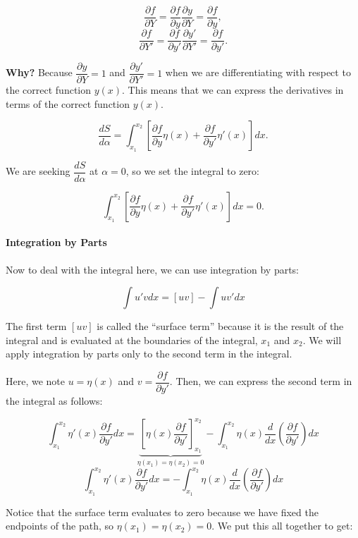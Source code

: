 \documentclass[11pt]{article}
\begin{document}
\[\dfrac{\partial f}{\partial Y} = \dfrac{\partial f}{\partial y}\dfrac{\partial y}{\partial Y} = \dfrac{\partial f}{\partial y},\]
\[\dfrac{\partial f}{\partial Y'} = \dfrac{\partial f}{\partial y'}\dfrac{\partial y'}{\partial Y'} = \dfrac{\partial f}{\partial y'}.\]

\textbf{Why?} Because \(\dfrac{\partial y}{\partial Y} = 1\) and
\(\dfrac{\partial y'}{\partial Y'} = 1\) when we are differentiating
with respect to the correct function \(y(x)\). This means that we can
express the derivatives in terms of the correct function \(y(x)\).

\[\dfrac{dS}{d\alpha} = \int_{x_1}^{x_2}\left[ \dfrac{\partial f}{\partial y}\eta(x) + \dfrac{\partial f}{\partial y'}\eta'(x) \right] dx.\]

We are seeking \(\dfrac{dS}{d\alpha}\) at \(\alpha = 0\), so we set the
integral to zero:

\[\int_{x_1}^{x_2}\left[ \dfrac{\partial f}{\partial y}\eta(x) + \dfrac{\partial f}{\partial y'}\eta'(x) \right] dx = 0.\]

    \paragraph{Integration by Parts}\label{integration-by-parts}

Now to deal with the integral here, we can use integration by parts:

\[\int u'v dx = [uv] - \int u v' dx\]

The first term \([uv]\) is called the ``surface term'' because it is the
result of the integral and is evaluated at the boundaries of the
integral, \(x_1\) and \(x_2\). We will apply integration by parts only
to the second term in the integral.

Here, we note \(u = \eta(x)\) and
\(v = \dfrac{\partial f}{\partial y'}\). Then, we can express the second
term in the integral as follows:

\[\int_{x_1}^{x_2} \eta'(x) \dfrac{\partial f}{\partial y'} dx = \underbrace{\left[ \eta(x) \dfrac{\partial f}{\partial y'} \right]_{x_1}^{x_2}}_{\eta(x_1)=\eta(x_2)=0} - \int_{x_1}^{x_2} \eta(x) \dfrac{d}{dx}\left( \dfrac{\partial f}{\partial y'} \right) dx\]
\[\int_{x_1}^{x_2} \eta'(x) \dfrac{\partial f}{\partial y'} dx = - \int_{x_1}^{x_2} \eta(x) \dfrac{d}{dx}\left( \dfrac{\partial f}{\partial y'} \right) dx\]

Notice that the surface term evaluates to zero because we have fixed the
endpoints of the path, so \(\eta(x_1) = \eta(x_2) = 0\). We put this all
together to get:
\end{document}
